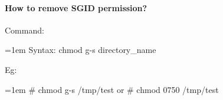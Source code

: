 \begin{flushleft}
	\paragraph{How to remove SGID permission?}
	\bigskip
	Command:
	\begin{tcolorbox}[breakable,notitle,boxrule=0pt,colback=pink,colframe=pink]
		\color{black}
		\font=1em
		Syntax: chmod g-s directory\_name
		\font=4pt
	\end{tcolorbox}
	Eg:
	\begin{tcolorbox}[breakable,notitle,boxrule=-0pt,colback=black,colframe=black]
		\color{green}
		\font=1em
		\# chmod g-s  /tmp/test
		\newline
		or
		\newline
		\# chmod 0750 /tmp/test
		\font=4pt
	\end{tcolorbox}
	
	
	
	
	
\end{flushleft}

\newpage

